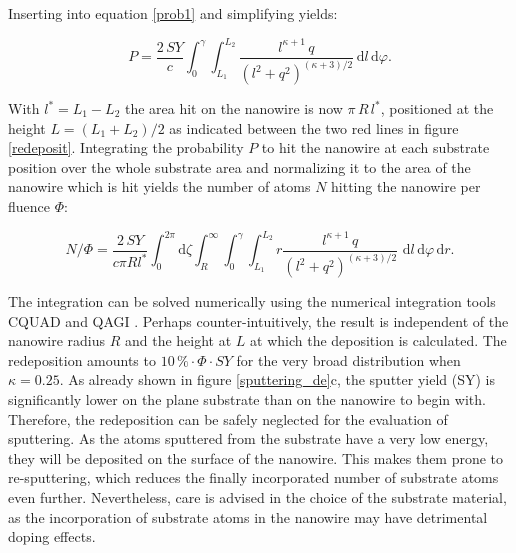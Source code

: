 Inserting into equation \ref{prob1} and simplifying yields:

\begin{equation}
\label{prob2}
P = \frac{2\,SY}{c} \int_0^{\gamma} \! \int_{L_1}^{L_2} \!  \frac{l^{\kappa+1}\,q}{(l^2 + q^2)^{(\kappa + 3)/2}} \,\mathrm{d}l \, \mathrm{d}\varphi.
\end{equation}

With $l^*=L_1-L_2$ the area hit on the nanowire is now $\pi \, R \, l^*$, positioned at the height $L= (L_1+L_2)/2$ as indicated between the two red lines in figure \ref{redeposit}. Integrating the probability $P$ to hit the nanowire at each substrate position over the whole substrate area and normalizing it to the area of the nanowire which is hit yields the number of atoms $N$ hitting the nanowire per fluence $\Phi$:

\begin{equation}
\label{prob2}
N/\Phi = \frac{2\,SY}{c \pi Rl^*} \int_0^{2\pi}\! \mathrm{d}\zeta \int_R^{\infty} \!
\int_0^{\gamma} \! \int_{L_1}^{L_2} \! r \frac{l^{\kappa+1}\,q}{(l^2 + q^2)^{(\kappa + 3)/2}}\,\,\mathrm{d}l \, \mathrm{d}\varphi\,\mathrm{d}r.
\end{equation}

The integration can be solved numerically using the numerical integration tools CQUAD and QAGI \cite{gough_gnu_2009}. Perhaps counter-intuitively, the result is independent of the nanowire radius $R$ and the height at $L$ at which the deposition is calculated. The redeposition amounts to $10\,\% \cdot \Phi\cdot SY$ for the very broad distribution when $\kappa = 0.25$. As already shown in figure \ref{sputtering_de}c, the sputter yield (SY) is significantly lower on the plane substrate than on the nanowire to begin with. Therefore, the redeposition can be safely neglected for the evaluation of sputtering. As the atoms sputtered from the substrate have a very low energy, they will be deposited on the surface of the nanowire. This makes them prone to re-sputtering, which reduces the finally incorporated number of substrate atoms even further. Nevertheless, care is advised in the choice of the substrate material, as the incorporation of substrate atoms in the nanowire may have detrimental doping effects.







